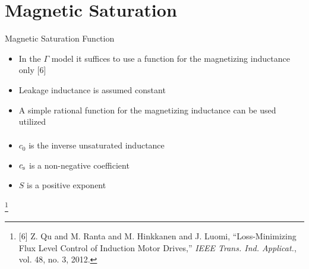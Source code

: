 \documentclass[11pt,aspectratio=169]{beamer}
\begin{document}
\section{Magnetic Saturation}
\begin{frame}{Magnetic Saturation Function}
\begin{itemize}
 \item In the $\Gamma$ model it suffices to use a function for the magnetizing inductance only [6]
\item Leakage inductance is assumed constant 
\item A simple rational function for the magnetizing inductance can be used utilized
    \begin{align*}
\end{align*}
\item $c_{0}$ is the inverse unsaturated inductance
\item $c_{\text{s}}$ is a non-negative coefficient 
\item $S$ is a positive exponent
\end{itemize}
\footnote{[6] Z. Qu and M. Ranta and M. Hinkkanen and J. Luomi, ``Loss-Minimizing Flux Level Control of Induction Motor Drives,'' \emph{IEEE Trans. Ind. Applicat.}, vol. 48, no. 3, 2012.}
\end{frame}
\end{document}
